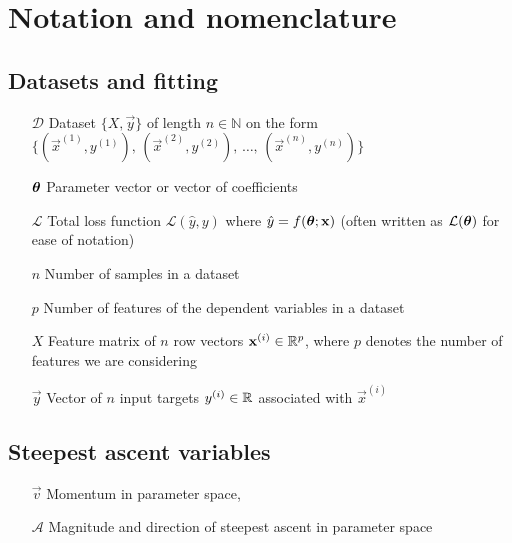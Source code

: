 


\tableofcontents
\section*{Notation and nomenclature}

\subsection*{Datasets and fitting} %
\begin{itemize}
    
    \item[$\mathcal{D}$] Dataset $\big\{ X, \vec{y} \big\}$ of length $n\in \mathbb{N}$ on the form $\big\{(\vec{x}^{(1)}, y^{(1)}),\,(\vec{x}^{(2)}, y^{(2)}),\,\dots, \, (\vec{x}^{(n)}, y^{(n)}) \big\} $
    \item[$\svec{\theta}$] Parameter vector or vector of coefficients 
    \item[$\mathcal{L}$] Total loss function $\mathcal{L}(\hat{y}, y)$ where $\hat{y}= f(\svec{\theta}; \vec{x})$ (often written as $\mathcal{L}(\svec{\theta})$ for ease of notation)
    \item[$n$] Number of samples in a dataset
    \item[$p$] Number of features of the dependent variables in a dataset
    \item[$X$] Feature matrix of $n$ row vectors $\vec{x}^{(i)} \in \RR[p]$, where $p$ denotes the number of features we are considering
    \item[$\vec{y}$] Vector of $n$ input targets $y^{(i)} \in \RR$ associated with $\vec{x}^{(i)}$
\end{itemize}
\subsection*{Steepest ascent variables}
\begin{itemize}
    \item[$\vec{v}$] Momentum in parameter space, 
    \item[$\mathcal{A}$] Magnitude and direction of steepest ascent in parameter space %
\end{itemize}

